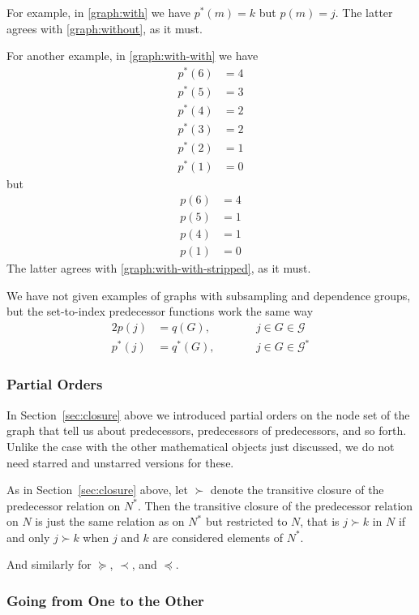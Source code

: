 For example, in \eqref{graph:with} we have $p^*(m) = k$ but $p(m) = j$.
The latter agrees with \eqref{graph:without}, as it must.

For another example, in \eqref{graph:with-with} we have
\begin{align*}
   p^*(6) & = 4
   \\
   p^*(5) & = 3
   \\
   p^*(4) & = 2
   \\
   p^*(3) & = 2
   \\
   p^*(2) & = 1
   \\
   p^*(1) & = 0
\end{align*}
but
\begin{align*}
   p(6) & = 4
   \\
   p(5) & = 1
   \\
   p(4) & = 1
   \\
   p(1) & = 0
\end{align*}
The latter agrees with \eqref{graph:with-with-stripped}, as it must.

We have not given examples of graphs with subsampling and dependence
groups, but the set-to-index predecessor functions work the same way
\begin{alignat*}{2}
   p(j) & = q(G), & \qquad & j \in G \in \mathcal{G}
   \\
   p^*(j) & = q^*(G), & & j \in G \in \mathcal{G}^*
\end{alignat*}

\subsubsection{Partial Orders}

In Section~\ref{sec:closure} above we introduced partial orders on the
node set of the graph that tell us about predecessors, predecessors of
predecessors, and so forth.  Unlike the case with the other mathematical
objects just discussed, we do not need starred and unstarred versions
for these.

As in Section~\ref{sec:closure} above, let $\succ$ denote the transitive
closure of the predecessor relation on $N^*$.  Then the transitive
closure of the predecessor relation on $N$ is just the same relation
as on $N^*$ but restricted to $N$, that is $j \succ k$ in $N$ if and only
$j \succ k$ when $j$ and $k$ are considered elements of $N^*$.

And similarly for $\succeq$, $\prec$, and $\preceq$.

\subsubsection{Going from One to the Other}

